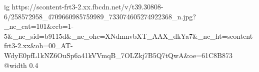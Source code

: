  
 
 
 
 

\ifcmt
  ig https://scontent-frt3-2.xx.fbcdn.net/v/t39.30808-6/258572958_4709660985759989_733074605274922368_n.jpg?_nc_cat=101&ccb=1-5&_nc_sid=b9115d&_nc_ohc=XNdmnvbXT_AAX_dkYa7&_nc_ht=scontent-frt3-2.xx&oh=00_AT-WdyE0pfL1kNZ6OuSp6a41kVVmqB_7OLZkj7B5Q7tQwA&oe=61C8B873
  @width 0.4
\fi
